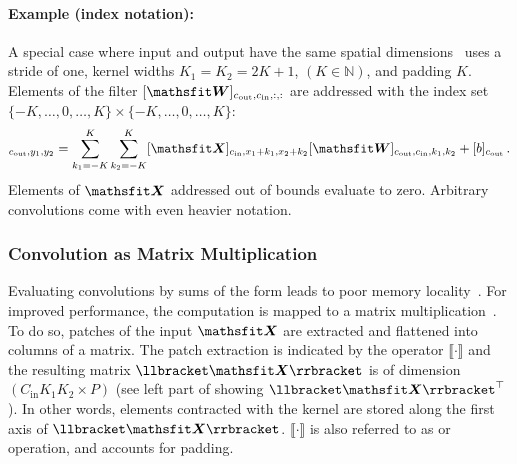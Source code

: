 \paragraph{Example (index notation):}
A special case where input and output have the same spatial
dimensions~\citep{grosse2016kronecker} uses a stride of one, kernel widths $K_1
= K_2 = 2 K + 1$, $(K\in \mathbb{N})$, and padding $K$. Elements of the filter
$[\tW]_{c_{\text{out}}, c_{\text{in}}, :, :}$ are addressed with the index set
$\{-K, \dots, 0, \dots, K\} \times \{-K, \dots, 0, \dots, K\}$:
\begin{align}
  [\tY]_{c_\text{out}, y_1, y_2} = \sum\limits_{k_1 = -K}^{K}
  \sum\limits_{k_2 = -K}^{K} [\tX]_{c_\text{in}, x_1 + k_1, x_2 + k_2}
  [\tW]_{c_\text{out}, c_{\text{in}}, k_1, k_2} + [b]_{c_\text{out}}\,.
  \label{hbp::equ:convolutionExample}
\end{align}
Elements of $\tX$ addressed out of bounds evaluate to zero. Arbitrary
convolutions come with even heavier notation.

\subsubsection{Convolution as Matrix Multiplication}

Evaluating convolutions by sums of the form 
leads to poor memory locality~\citep{grosse2016kronecker}. For improved
performance, the computation is mapped to a matrix
multiplication~\citep{chellapilla2006HighPerformanceCNN}. To do so, patches of
the input $\tX$ are extracted and flattened into columns of a matrix. The patch
extraction is indicated by the operator $\llbracket \cdot \rrbracket$ and the
resulting matrix $\llbracket \tX \rrbracket$ is of dimension $(C_\text{in} K_1
K_2\times P)$ (see left part of 
showing $\llbracket \tX\rrbracket^\top$). In other words, elements contracted
with the kernel are stored along the first axis of $\llbracket \tX \rrbracket$.
$\llbracket \cdot \rrbracket$ is also referred to as  or
 operation, and accounts for
padding.

